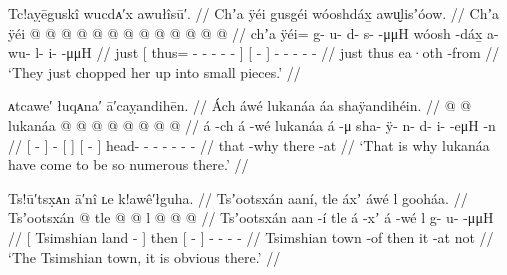 \ex\label{ex:89-58-chop-small-pieces}%
%
\begingl
	\glpreamble	Tc!aỵēguskî wucdᴀ′x awułîsū′. //
	\glpreamble	Chʼa ÿéi gusgéi wóoshdáx̱ awu̬lisʼóow. //
	\gla	Chʼa {} ÿéi @  @ {} @ {} @ {} @ {} @ {} @ {} {}
		{}  @ {} {}
		 @ {} @ {} @ {} @ {} @ {} //
	\glb	chʼa {} ÿéi= g- u- d- s-  -μμH {} {}
		{} wóosh -dáx̱ {}
		a- wu- l- i-  -μμH //
	\glc	just {}[ thus= - - - -  - \· {}]
		{}[  - {}]
		- - - -  - //
	\gld	just {} thus  {} {} {} {} {} {} {}
		{} ea·oth -from {}
		 {} {} {} {} {} //
	\glft	‘They just chopped her up into small pieces.’
		//
\endgl
\xe

\ex\label{ex:89-59-many-lukanaa}%
%
\begingl
	\glpreamble	ᴀtcawe′ łuqᴀna′ ā′caỵandihēn. //
	\glpreamble	Ách áwé lukanáa áa shaÿandihéin. //
	\gla	{}  @ {} {}
		 @ {}
		{} lukanáa {}
		{}  @ {} {}
		 @ {} @ {} @ {} @ {} @ {} @ {} @ {} //
	\glb	{} á -ch {}
		á -wé
		{} lukanáa {}
		{} á -μ {}
		sha- ÿ- n- d- i-  -eμH -n //
	\glc	{}[  - {}]
		 -
		{}[  {}]
		{}[  - {}]
		head- - - - -  - - //
	\gld	{} that -why {}
		 {}
		{}  {}
		{} there -at {}
		 {} {} {} {} {} {} {} //
	\glft	‘That is why lukanáa have come to be so numerous there.’
		//
\endgl
\xe

\ex\label{ex:89-60-Tsimshian-town}%
%
\begingl
	\glpreamble	Ts!ū′tsx̣ᴀn ā′nî ʟe k!awê′łguha. //
	\glpreamble	Tsʼootsxán aaní, tle áxʼ áwé l gooháa. //
	\gla	{} Tsʼootsxán  @ {} {}
		tle {}  @ {} {}
		 @ {}
		l  @ {} @ {} @ {} //
	\glb	{} Tsʼootsxán aan -í {}
		tle {} á -xʼ {}
		á -wé
		l g- u-  -μμH //
	\glc	{}[ Tsimshian land - {}]
		then {}[  - {}]
		 -
		 - -  - //
	\gld	{} Tsimshian town -of {}
		then {} it -at {}
		 {}
		not  {} {} {} //
	\glft	‘The Tsimshian town, it is obvious there.’
		//
\endgl
\xe

